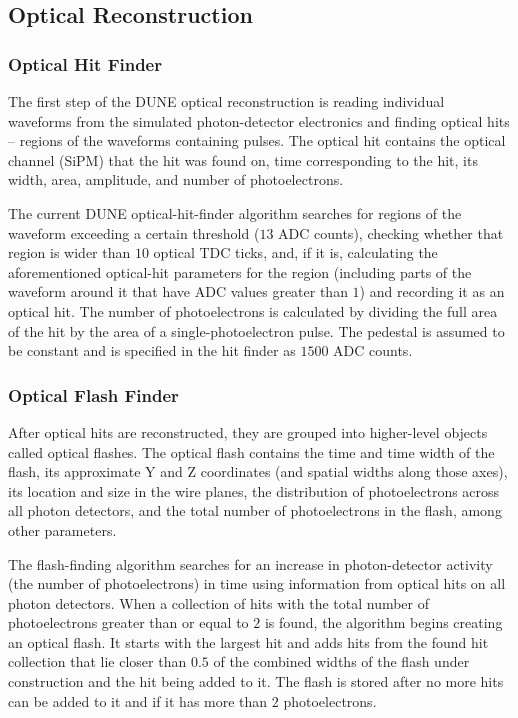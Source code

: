 \subsection{Optical Reconstruction}

\subsubsection{Optical Hit Finder}
\label{sec:OpticalHitFinder}
The first step of the DUNE optical reconstruction is reading
individual waveforms from the simulated photon-detector electronics
and finding optical hits -- regions of the waveforms containing pulses.
The optical hit contains the optical channel (SiPM) that the hit
was found on, time corresponding to the hit, its width,
area, amplitude, and number of photoelectrons.

The current DUNE optical-hit-finder algorithm searches for regions of the waveform
exceeding a certain threshold ($13$ ADC counts), checking whether that region
is wider than $10$ optical TDC ticks, and, if it is, calculating the aforementioned
optical-hit parameters for the region (including parts of the waveform around it
that have ADC values greater than $1$) and recording it as an optical hit.
The number of photoelectrons is calculated by dividing the full area of the hit
by the area of a single-photoelectron pulse.
The pedestal is assumed to be constant and is specified in the hit finder as $1500$ ADC counts.


\subsubsection{Optical Flash Finder}
After optical hits are reconstructed, they are grouped into higher-level objects called optical flashes.
The optical flash contains the time and time width of the flash,
its approximate Y and Z coordinates (and spatial widths along those axes),
its location and size in the wire planes,
the distribution of photoelectrons across all photon detectors,
and the total number of photoelectrons in the flash, among other parameters.

The flash-finding algorithm searches for an increase in photon-detector activity
(the number of photoelectrons) in time using information from optical hits
on all photon detectors.
When a collection of hits with the total number of photoelectrons 
greater than or equal to $2$ is found, the algorithm begins creating an optical flash.
It starts with the largest hit and adds hits from the found hit collection 
that lie closer than $0.5$ of the combined widths of the flash under construction
and the hit being added to it.
The flash is stored after no more hits can be added to it
and if it has more than $2$ photoelectrons.

